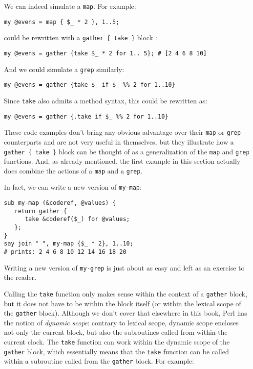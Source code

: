 We can indeed simulate a \verb'map'. For example:

\begin{verbatim}
my @evens = map { $_ * 2 }, 1..5;
\end{verbatim}

could be rewritten with a \verb'gather { take }' 
block :

\begin{verbatim}
my @evens = gather {take $_ * 2 for 1.. 5}; # [2 4 6 8 10]
\end{verbatim}

And we could simulate a {\tt grep} similarly:

\begin{verbatim}
my @evens = gather {take $_ if $_ %% 2 for 1..10}
\end{verbatim}

Since {\tt take} also admits a method syntax, this could 
be rewritten as:

\begin{verbatim}
my @evens = gather {.take if $_ %% 2 for 1..10}
\end{verbatim}


These code examples don't bring any obvious advantage 
over their \verb'map' or {\tt grep} counterparts and 
are not very useful in themselves, but they illustrate 
how a \verb'gather { take }' block can be thought 
of as a generalization of the \verb'map' and 
{\tt grep} functions. And, as already mentioned, 
the first example in this section actually does combine 
the actions of a {\tt map} and a {\tt grep}.

In fact, we can write a new version of {\tt my-map}:

\begin{verbatim}
sub my-map (&coderef, @values) {
   return gather {
      take &coderef($_) for @values;
   };
}
say join " ", my-map {$_ * 2}, 1..10;
# prints: 2 4 6 8 10 12 14 16 18 20
\end{verbatim}

Writing a new version of {\tt my-grep} is just 
about as easy and left as an exercise to the reader.

Calling the {\tt take} function only makes sense 
within the context of a \verb'gather' block, but 
it does not have to be within the block itself 
(or within the lexical scope of the \verb'gather' 
block). Although we don't cover that elsewhere in this book, 
Perl has the notion of \emph{dynamic scope}: contrary 
to lexical scope, dynamic scope encloses not only 
the current block, but also the subroutines called 
from within the current clock. The {\tt take} function 
can work within the dynamic scope of the \verb'gather' 
block, which essentially means that the {\tt take} 
function can be called within a subroutine called from 
the \verb'gather' block. For example:

